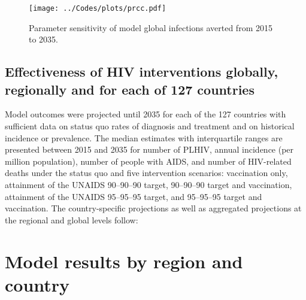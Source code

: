 \documentclass[11pt]{article}
\begin{document}
\begin{figure}
  \centering
  \texttt{[image: ../Codes/plots/prcc.pdf]}
  \caption{Parameter sensitivity of model global infections averted
    from 2015 to 2035.}
  \label{PRCCs}
\end{figure}


\subsection{Effectiveness of HIV interventions globally, regionally
  and for each of 127 countries}

Model outcomes were projected until 2035 for each of the 127 countries
with sufficient data on status quo rates of diagnosis and treatment
and on historical incidence or prevalence. The median estimates with
interquartile ranges are presented between 2015 and 2035 for number of
PLHIV, annual incidence (per million population), number of people
with AIDS, and number of HIV-related deaths under the status quo and
five intervention scenarios: vaccination only, attainment of the
UNAIDS 90--90--90 target, 90--90--90 target and vaccination, attainment of
the UNAIDS 95--95--95 target, and 95--95--95 target and vaccination.  The
country-specific projections as well as aggregated projections at the
regional and global levels follow:


\clearpage




\appendix
\newpage
\vspace*{3in}
\section{Model results by region and country}
\newpage

\end{document}
